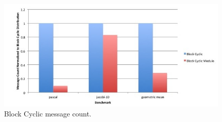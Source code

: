 \begin{figure}
	\begin{center}
	\includegraphics[scale=0.30]{./Figures/block_cyclic_message_count}
	\caption{Block Cyclic message count.}
	\label{block_cyclic_message_count}
	\end{center}
\end{figure}
